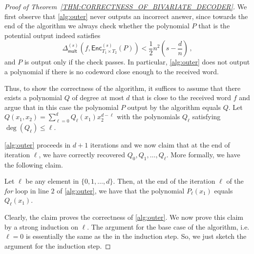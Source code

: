 \documentclass{theoretics}
\def\Field{\mathbb{F}}
\let\F\Field
\newcommand{\enc}{{\mathsf{Enc}}}
\newcommand{\Delm}{\Delta_{\mathsf{mult}}}
\begin{document}
	\begin{proof}[Proof of Theorem~\ref{THM:CORRECTNESS_OF_BIVARIATE_DECODER}]
		\label{proof:bivariate_decoder}
		We first observe that \cref{alg:outer} never outputs an incorrect answer, since towards the end of the algorithm we always check whether the polynomial $P$ that is the potential output indeed 
		satisfies \[
		\Delm^{(s)}(f,\enc^{(s)}_{T_1 \times T_2}(P)) < \frac{1}{2} n^2 \left(s-\frac{d}{n}\right) \, ,
		\]
		and $P$ is output only if the check passes. In particular, \cref{alg:outer} does not output a polynomial if there is no codeword close enough to the received word. 
		
		Thus, to show the correctness of the algorithm, it suffices to assume that there exists a polynomial $Q$ of degree at most $d$ that is close to the received word $f$ and argue that in this case the polynomial $P$  output by the algorithm equals $Q$. Let $Q(x_1,x_2) = \sum_{\ell = 0}^d Q_{\ell}(x_1)x_2^{d-\ell}$ with the polynomials $Q_{\ell}$ satisfying $\deg(Q_{\ell}) \leq \ell$.  
		
		\cref{alg:outer} proceeds in $d+1$ iterations and we now claim that at the end of iteration $\ell$,  we have correctly recovered $Q_{0}, Q_1, \ldots, Q_{\ell}$.  More formally, we have the following claim. 
		
		\begin{claim}\label{claim: correctness of bivariate algorithm induction}
			Let $\ell$ be any element in $\{0, 1, \ldots, d\}$. Then, at the end of the iteration $\ell$ of the \emph{for} loop in line $2$ of \cref{alg:outer}, we have that the polynomial $P_{\ell}(x_1)$ equals $Q_{\ell}(x_1)$. 
		\end{claim}
		Clearly, the claim proves the correctness of \cref{alg:outer}. We now prove this claim by a strong induction on $\ell$. The argument for the base case of the algorithm, i.e. $\ell = 0$ is essentially the same as the in the induction step. So, we just sketch the argument for the induction step. 
		

\end{proof}
\end{document}
